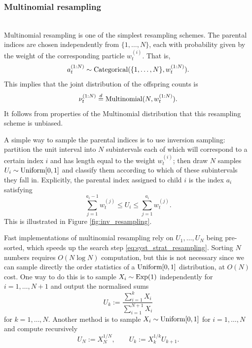  
\subsubsection{Multinomial resampling}
\\
Multinomial resampling \parencite{gordon1993,efron1994} is one of the simplest resampling schemes.
The parental indices are chosen independently from $\{1, \dots, N\}$, each with probability given by the weight of the corresponding particle $w_t^{(i)}$. 
That is, 
\begin{equation*}
a_t^{(1:N)} \sim \operatorname{Categorical}( \{1,\dots, N\}, w_t^{(1:N)} ) .
\end{equation*}
This implies that the joint distribution of the offspring counts is 
\begin{equation*}
\nu_t^{(1:N)} \overset{d}{=} \operatorname{Multinomial}(N, w_t^{(1:N)} ) .
\end{equation*}
It follows from properties of the Multinomial distribution that this resampling scheme is unbiased.

A simple way to sample the parental indices is to use inversion sampling: partition the unit interval into $N$ subintervals each of which will correspond to a certain index $i$ and has length equal to the weight $w_t^{(i)}$; then draw $N$ samples $U_i \sim \operatorname{Uniform}[0,1]$ and classify them according to which of these subintervals they fall in.
Explicitly, the parental index assigned to child $i$ is the index $a_i$ satisfying
\begin{equation}\label{eq:syst_strat_resampling}
\sum_{j=1}^{a_i -1} w_t^{(j)} \leq U_i \leq \sum_{j=1}^{a_i} w_t^{(j)} .
\end{equation}
This is illustrated in Figure \ref{fig:inv_resampling}. 

Fast implementations of multinomial resampling rely on $U_1,\dots,U_N$ being pre-sorted, which speeds up the search step \eqref{eq:syst_strat_resampling}. Sorting $N$ numbers requires $O(N\log N)$ computation, but this is not necessary since we can sample directly the order statistics of a $\operatorname{Uniform}[0,1]$ distribution, at $O(N)$ cost.
One way to do this \parencite[Proposition 9.1]{chopin2020} is to sample $X_i \sim \operatorname{Exp}(1)$ independently for $i=1,\dots,N+1$ and output the normalised sums
\begin{equation*}
U_k := \frac{\sum_{i=1}^k X_i}{\sum_{i=1}^{N+1} X_i}
\end{equation*}
for $k=1,\dots,N$.
Another method \parencite{hol2006} is to sample $X_i \sim \operatorname{Uniform}[0,1]$ for $i=1,\dots,N$ and compute recursively
\begin{equation*}
U_N := X_N^{1/N} , \qquad U_k := X_k^{1/k} U_{k+1} .
\end{equation*}

